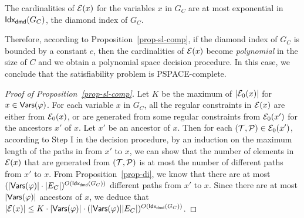 \begin{proposition}\label{prop-sl-comp}
The cardinalities of $\mathcal{E}(x)$ for the variables $x$ in $G_C$ are at most exponential in ${\sf Idx_{dmd}}(G_C)$, the diamond index of $G_C$.
\end{proposition}
Therefore, according to Proposition~\ref{prop-sl-comp}, if the diamond index of $G_C$ is bounded by a constant $c$, then the cardinalities of $\mathcal{E}(x)$ become \emph{polynomial} in the size of $C$ and we obtain a polynomial space decision procedure. In this case, we conclude that the satisfiability problem is PSPACE-complete.

\begin{proof}[Proof of Proposition~\ref{prop-sl-comp}]
Let $K$ be the maximum of $|\mathcal{E}_0(x)|$ for $x \in \mathsf{Vars}(\varphi)$.
For each variable $x$ in $G_C$, all the regular constraints in $\mathcal{E}(x)$ are either from $\mathcal{E}_0(x)$, or are generated from some regular constraints from $\mathcal{E}_0(x')$ for the ancestors $x'$ of $x$. Let $x'$ be an ancestor of $x$. Then for each $(\mathcal{T}, \mathcal{P}) \in \mathcal{E}_0(x')$, according to Step I in the decision procedure, by an induction on the maximum length of the paths in from $x'$ to $x$, we can show that the number of elements in $\mathcal{E}(x)$ that are generated from $(\mathcal{T}, \mathcal{P})$ is at most the number of different paths from $x'$ to $x$.
%
From Proposition~\ref{prop-di}, we know that there are at most $(|\mathsf{Vars}(\varphi)|\cdot |E_C|)^{O({\sf Idx_{dmd}}(G_C))}$ different paths from $x'$ to $x$. Since there are at most $|\mathsf{Vars}(\varphi)|$ ancestors of $x$, we deduce that $|\mathcal{E}(x)| \le K \cdot |\mathsf{Vars}(\varphi)| \cdot (|\mathsf{Vars}(\varphi)||E_C|)^{O({\sf Idx_{dmd}}(G_C))}$.
\end{proof}

